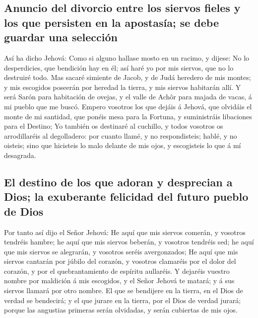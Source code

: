 \hypertarget{anuncio-del-divorcio-entre-los-siervos-fieles-y-los-que-persisten-en-la-apostasuxeda-se-debe-guardar-una-selecciuxf3n}{%
\subsection{Anuncio del divorcio entre los siervos fieles y los que
persisten en la apostasía; se debe guardar una
selección}\label{anuncio-del-divorcio-entre-los-siervos-fieles-y-los-que-persisten-en-la-apostasuxeda-se-debe-guardar-una-selecciuxf3n}}

 Así ha dicho Jehová: Como si alguno hallase mosto en un
racimo, y dijese: No lo desperdicies, que bendición hay en él; así haré
yo por mis siervos, que no lo destruiré todo.  Mas sacaré
simiente de Jacob, y de Judá heredero de mis montes; y mis escogidos
poseerán por heredad la tierra, y mis siervos habitarán allí.
 Y será Sarón para habitación de ovejas, y el valle de
Achôr para majada de vacas, á mi pueblo que me buscó. 
Empero vosotros los que dejáis á Jehová, que olvidáis el monte de mi
santidad, que ponéis mesa para la Fortuna, y suministráis libaciones
para el Destino;  Yo también os destinaré al cuchillo, y
todos vosotros os arrodillaréis al degolladero: por cuanto llamé, y no
respondisteis; hablé, y no oisteis; sino que hicisteis lo malo delante
de mis ojos, y escogisteis lo que á mí desagrada.

\hypertarget{el-destino-de-los-que-adoran-y-desprecian-a-dios-la-exuberante-felicidad-del-futuro-pueblo-de-dios}{%
\subsection{El destino de los que adoran y desprecian a Dios; la
exuberante felicidad del futuro pueblo de
Dios}\label{el-destino-de-los-que-adoran-y-desprecian-a-dios-la-exuberante-felicidad-del-futuro-pueblo-de-dios}}

 Por tanto así dijo el Señor Jehová: He aquí que mis
siervos comerán, y vosotros tendréis hambre; he aquí que mis siervos
beberán, y vosotros tendréis sed; he aquí que mis siervos se alegrarán,
y vosotros seréis avergonzados;  He aquí que mis siervos
cantarán por júbilo del corazón, y vosotros clamaréis por el dolor del
corazón, y por el quebrantamiento de espíritu aullaréis. 
Y dejaréis vuestro nombre por maldición á mis escogidos, y el Señor
Jehová te matará; y á sus siervos llamará por otro nombre.
 El que se bendijere en la tierra, en el Dios de verdad
se bendecirá; y el que jurare en la tierra, por el Dios de verdad
jurará; porque las angustias primeras serán olvidadas, y serán cubiertas
de mis ojos.

